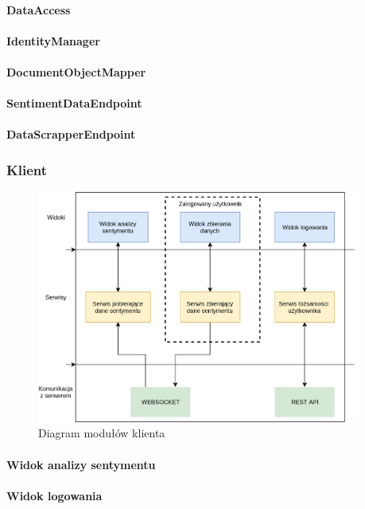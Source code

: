 \paragraph*{DataAccess}
\paragraph*{IdentityManager}
\paragraph*{DocumentObjectMapper}
\paragraph*{SentimentDataEndpoint}
\paragraph*{DataScrapperEndpoint}

\newpage
\subsubsection{Klient}
\begin{figure}[h!]
  \centering
    \includegraphics[width=0.95\textwidth]{img/client-modules.png}
  \caption{Diagram modułów klienta}
  \label{fig:client}
\end{figure}

\paragraph*{Widok analizy sentymentu}
\paragraph*{Widok logowania}
